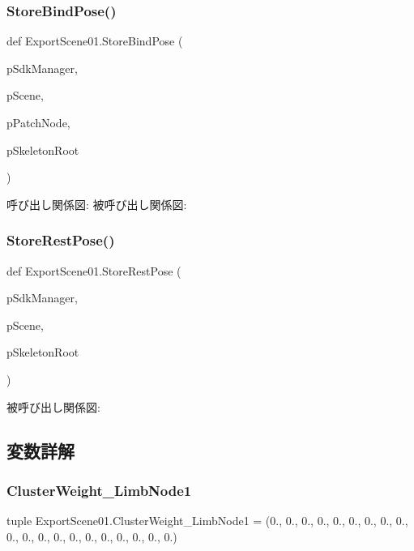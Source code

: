 \subsubsection{\texorpdfstring{Store\+Bind\+Pose()}{StoreBindPose()}}
{\footnotesize\ttfamily def Export\+Scene01.\+Store\+Bind\+Pose (\begin{DoxyParamCaption}\item[{}]{p\+Sdk\+Manager,  }\item[{}]{p\+Scene,  }\item[{}]{p\+Patch\+Node,  }\item[{}]{p\+Skeleton\+Root }\end{DoxyParamCaption})}

呼び出し関係図\+:
被呼び出し関係図\+:
\mbox{\label{namespace_export_scene01_a67dba7f60fcb643e5c43940ed47dd820}} 
\subsubsection{\texorpdfstring{Store\+Rest\+Pose()}{StoreRestPose()}}
{\footnotesize\ttfamily def Export\+Scene01.\+Store\+Rest\+Pose (\begin{DoxyParamCaption}\item[{}]{p\+Sdk\+Manager,  }\item[{}]{p\+Scene,  }\item[{}]{p\+Skeleton\+Root }\end{DoxyParamCaption})}

被呼び出し関係図\+:


\subsection{変数詳解}
\mbox{\label{namespace_export_scene01_aece84d413185a9c148721f54cb1f81cf}} 
\subsubsection{\texorpdfstring{Cluster\+Weight\+\_\+\+Limb\+Node1}{ClusterWeight\_LimbNode1}}
{\footnotesize\ttfamily tuple Export\+Scene01.\+Cluster\+Weight\+\_\+\+Limb\+Node1 = (0., 0., 0., 0., 0., 0., 0., 0., 0., 0., 0., 0., 0., 0., 0., 0., 0., 0., 0., 0.)}

